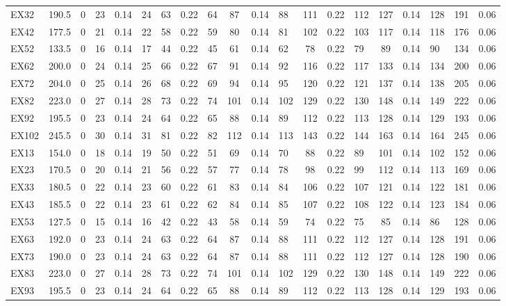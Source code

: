 \documentclass[preprint, 3p, review, 12pt]{elsarticle}
\begin{document}
\begin{table}[h!]
{\begin{tabular}{|lr|lcr|lcr|lcr|lcr|lcr|lcr|}
EX32 & 190.5 & 0 & 23 & 0.14 & 24 & 63 & 0.22 & 64 & 87 & 0.14 & 88 & 111 & 0.22 & 112 & 127 & 0.14 & 128 & 191 & 0.06 \\
EX42 & 177.5 & 0 & 21 & 0.14 & 22 & 58 & 0.22 & 59 & 80 & 0.14 & 81 & 102 & 0.22 & 103 & 117 & 0.14 & 118 & 176 & 0.06 \\
EX52 & 133.5 & 0 & 16 & 0.14 & 17 & 44 & 0.22 & 45 & 61 & 0.14 & 62 & 78 & 0.22 & 79 & 89 & 0.14 & 90 & 134 & 0.06 \\
EX62 & 200.0 & 0 & 24 & 0.14 & 25 & 66 & 0.22 & 67 & 91 & 0.14 & 92 & 116 & 0.22 & 117 & 133 & 0.14 & 134 & 200 & 0.06 \\
EX72 & 204.0 & 0 & 25 & 0.14 & 26 & 68 & 0.22 & 69 & 94 & 0.14 & 95 & 120 & 0.22 & 121 & 137 & 0.14 & 138 & 205 & 0.06 \\
EX82 & 223.0 & 0 & 27 & 0.14 & 28 & 73 & 0.22 & 74 & 101 & 0.14 & 102 & 129 & 0.22 & 130 & 148 & 0.14 & 149 & 222 & 0.06 \\
EX92 & 195.5 & 0 & 23 & 0.14 & 24 & 64 & 0.22 & 65 & 88 & 0.14 & 89 & 112 & 0.22 & 113 & 128 & 0.14 & 129 & 193 & 0.06 \\
EX102 & 245.5 & 0 & 30 & 0.14 & 31 & 81 & 0.22 & 82 & 112 & 0.14 & 113 & 143 & 0.22 & 144 & 163 & 0.14 & 164 & 245 & 0.06 \\
EX13 & 154.0 & 0 & 18 & 0.14 & 19 & 50 & 0.22 & 51 & 69 & 0.14 & 70 & 88 & 0.22 & 89 & 101 & 0.14 & 102 & 152 & 0.06 \\
EX23 & 170.5 & 0 & 20 & 0.14 & 21 & 56 & 0.22 & 57 & 77 & 0.14 & 78 & 98 & 0.22 & 99 & 112 & 0.14 & 113 & 169 & 0.06 \\
EX33 & 180.5 & 0 & 22 & 0.14 & 23 & 60 & 0.22 & 61 & 83 & 0.14 & 84 & 106 & 0.22 & 107 & 121 & 0.14 & 122 & 181 & 0.06 \\
EX43 & 185.5 & 0 & 22 & 0.14 & 23 & 61 & 0.22 & 62 & 84 & 0.14 & 85 & 107 & 0.22 & 108 & 122 & 0.14 & 123 & 184 & 0.06 \\
EX53 & 127.5 & 0 & 15 & 0.14 & 16 & 42 & 0.22 & 43 & 58 & 0.14 & 59 & 74 & 0.22 & 75 & 85 & 0.14 & 86 & 128 & 0.06 \\
EX63 & 192.0 & 0 & 23 & 0.14 & 24 & 63 & 0.22 & 64 & 87 & 0.14 & 88 & 111 & 0.22 & 112 & 127 & 0.14 & 128 & 191 & 0.06 \\
EX73 & 190.0 & 0 & 23 & 0.14 & 24 & 63 & 0.22 & 64 & 87 & 0.14 & 88 & 111 & 0.22 & 112 & 127 & 0.14 & 128 & 190 & 0.06 \\
EX83 & 223.0 & 0 & 27 & 0.14 & 28 & 73 & 0.22 & 74 & 101 & 0.14 & 102 & 129 & 0.22 & 130 & 148 & 0.14 & 149 & 222 & 0.06 \\
EX93 & 195.5 & 0 & 23 & 0.14 & 24 & 64 & 0.22 & 65 & 88 & 0.14 & 89 & 112 & 0.22 & 113 & 128 & 0.14 & 129 & 193 & 0.06 \\

\end{tabular}}
\end{table}
\end{document}
